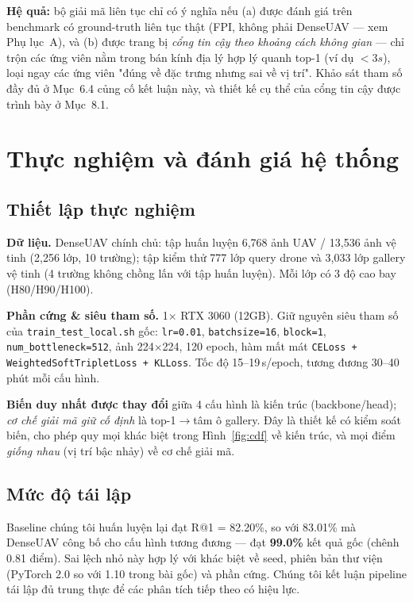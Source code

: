 \documentclass[11pt]{article}
\begin{document}
\textbf{Hệ quả:} bộ giải mã liên tục chỉ có ý nghĩa nếu (a) được đánh giá trên benchmark có ground-truth liên tục thật (FPI, không phải DenseUAV — xem Phụ lục~A), và (b) được trang bị \emph{cổng tin cậy theo khoảng cách không gian} — chỉ trộn các ứng viên nằm trong bán kính địa lý hợp lý quanh top-1 (ví dụ $<3s$), loại ngay các ứng viên "đúng về đặc trưng nhưng sai về vị trí". Khảo sát tham số đầy đủ ở Mục~6.4 củng cố kết luận này, và thiết kế cụ thể của cổng tin cậy được trình bày ở Mục~8.1.

\section{Thực nghiệm và đánh giá hệ thống}

\subsection{Thiết lập thực nghiệm}

\textbf{Dữ liệu.} DenseUAV chính chủ: tập huấn luyện 6{,}768 ảnh UAV / 13{,}536 ảnh vệ tinh (2{,}256 lớp, 10 trường); tập kiểm thử 777 lớp query drone và 3{,}033 lớp gallery vệ tinh (4 trường không chồng lấn với tập huấn luyện). Mỗi lớp có 3 độ cao bay (H80/H90/H100).

\textbf{Phần cứng \& siêu tham số.} 1$\times$ RTX 3060 (12GB). Giữ nguyên siêu tham số của \texttt{train\_test\_local.sh} gốc: \texttt{lr=0.01}, \texttt{batchsize=16}, \texttt{block=1}, \texttt{num\_bottleneck=512}, ảnh 224$\times$224, 120 epoch, hàm mất mát \texttt{CELoss + WeightedSoftTripletLoss + KLLoss}. Tốc độ 15--19\,s/epoch, tương đương 30--40 phút mỗi cấu hình.

\textbf{Biến duy nhất được thay đổi} giữa 4 cấu hình là kiến trúc (backbone/head); \emph{cơ chế giải mã giữ cố định} là top-1$\to$tâm ô gallery. Đây là thiết kế có kiểm soát biến, cho phép quy mọi khác biệt trong Hình~\ref{fig:cdf} về kiến trúc, và mọi điểm \emph{giống nhau} (vị trí bậc nhảy) về cơ chế giải mã.

\subsection{Mức độ tái lập}

Baseline chúng tôi huấn luyện lại đạt R@1 = 82.20\%, so với 83.01\% mà DenseUAV công bố cho cấu hình tương đương --- đạt \textbf{99.0\%} kết quả gốc (chênh 0.81 điểm). Sai lệch nhỏ này hợp lý với khác biệt về seed, phiên bản thư viện (PyTorch 2.0 so với 1.10 trong bài gốc) và phần cứng. Chúng tôi kết luận pipeline tái lập đủ trung thực để các phân tích tiếp theo có hiệu lực.
\end{document}
